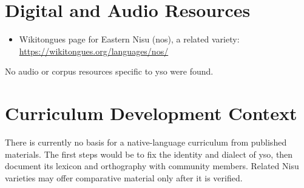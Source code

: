 \documentclass[12pt]{article}
\begin{document}
\section{Digital and Audio Resources}
\begin{itemize}
\item Wikitongues page for Eastern Nisu (nos), a related variety: \url{https://wikitongues.org/languages/nos/}
\end{itemize}
No audio or corpus resources specific to yso were found.

\section{Curriculum Development Context}
There is currently no basis for a native-language curriculum from published materials. The first steps would be to fix the identity and dialect of yso, then document its lexicon and orthography with community members. Related Nisu varieties may offer comparative material only after it is verified.
\end{document}
